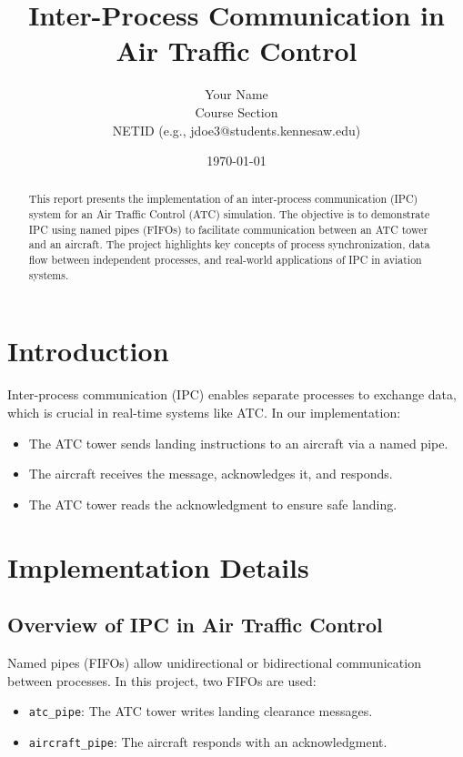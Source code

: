 \documentclass[12pt, onecolumn]{IEEEtran}
\title{Inter-Process Communication in Air Traffic Control}
\author{Your Name \\ Course Section \\ NETID (e.g., jdoe3@students.kennesaw.edu)}
\date{\today}
\begin{document}
\maketitle

\begin{abstract}
This report presents the implementation of an inter-process communication (IPC) system for an Air Traffic Control (ATC) simulation. The objective is to demonstrate IPC using named pipes (FIFOs) to facilitate communication between an ATC tower and an aircraft. The project highlights key concepts of process synchronization, data flow between independent processes, and real-world applications of IPC in aviation systems.
\end{abstract}

\section{Introduction}
Inter-process communication (IPC) enables separate processes to exchange data, which is crucial in real-time systems like ATC. In our implementation:
\begin{itemize}
    \item The ATC tower sends landing instructions to an aircraft via a named pipe.
    \item The aircraft receives the message, acknowledges it, and responds.
    \item The ATC tower reads the acknowledgment to ensure safe landing.
\end{itemize}

\section{Implementation Details}

\subsection{Overview of IPC in Air Traffic Control}
Named pipes (FIFOs) allow unidirectional or bidirectional communication between processes. In this project, two FIFOs are used:
\begin{itemize}
    \item \texttt{atc\_pipe}: The ATC tower writes landing clearance messages.
    \item \texttt{aircraft\_pipe}: The aircraft responds with an acknowledgment.
\end{itemize}
\end{document}
